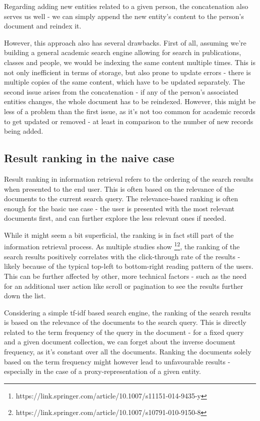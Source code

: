 Regarding adding new entities related to a given person, the concatenation also serves us well - we can simply append the new entity's content to the person's document and reindex it.

However, this approach also has several drawbacks. First of all, assuming we're building a general academic search engine allowing for search in publications, classes and people, we would be indexing the same content multiple times.
This is not only inefficient in terms of storage, but also prone to update errors - there is multiple copies of the same content, which have to be updated separately.
The second issue arises from the concatenation - if any of the person's associated entities changes, the whole document has to be reindexed.
However, this might be less of a problem than the first issue, as it's not too common for academic records to get updated or removed - at least in comparison to the number of new records being added.

\subsection{Result ranking in the naive case} \label{search-ranking-issues}

Result ranking in information retrieval refers to the ordering of the search results when presented to the end user. This is often based on the relevance of the documents to the current search query.
The relevance-based ranking is often enough for the basic use case - the user is presented with the most relevant documents first, and can further explore the less relevant ones if needed.

While it might seem a bit superficial, the ranking is in fact still part of the information retrieval process. 
As multiple studies show \footnote{https://link.springer.com/article/10.1007/s11151-014-9435-y}\footnote{https://link.springer.com/article/10.1007/s10791-010-9150-8}, 
the ranking of the search results positively correlates with the click-through rate of the results 
- likely because of the typical top-left to bottom-right reading pattern of the users.
This can be further affected by other, more technical factors - such as the need for an additional user action like scroll or pagination to see the results further down the list.


Considering a simple tf-idf based search engine, the ranking of the search results is based on the relevance of the documents to the search query.
This is directly related to the term frequency of the query in the document - for a fixed query and a given document collection, we can forget about the inverse document frequency, as it's constant over all the documents.
Ranking the documents solely based on the term frequency might however lead to unfavourable results - especially in the case of a proxy-representation of a given entity.


